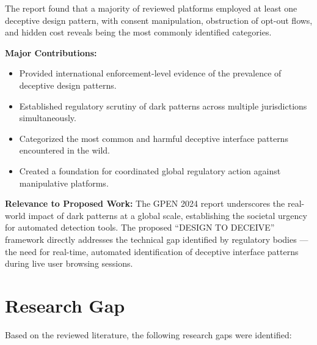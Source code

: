 The report found that a majority of reviewed platforms employed at least one deceptive design pattern, with consent manipulation, obstruction of opt-out flows, and hidden cost reveals being the most commonly identified categories.

\vspace{0.3cm}

\textbf{Major Contributions:}
\begin{itemize}
\item Provided international enforcement-level evidence of the prevalence of deceptive design patterns.
\item Established regulatory scrutiny of dark patterns across multiple jurisdictions simultaneously.
\item Categorized the most common and harmful deceptive interface patterns encountered in the wild.
\item Created a foundation for coordinated global regulatory action against manipulative platforms.
\end{itemize}

\vspace{0.3cm}

\textbf{Relevance to Proposed Work:}
The GPEN 2024 report underscores the real-world impact of dark patterns at a global scale, establishing the societal urgency for automated detection tools. The proposed ``DESIGN TO DECEIVE'' framework directly addresses the technical gap identified by regulatory bodies — the need for real-time, automated identification of deceptive interface patterns during live user browsing sessions.


\section{Research Gap}

Based on the reviewed literature, the following research gaps were identified:

